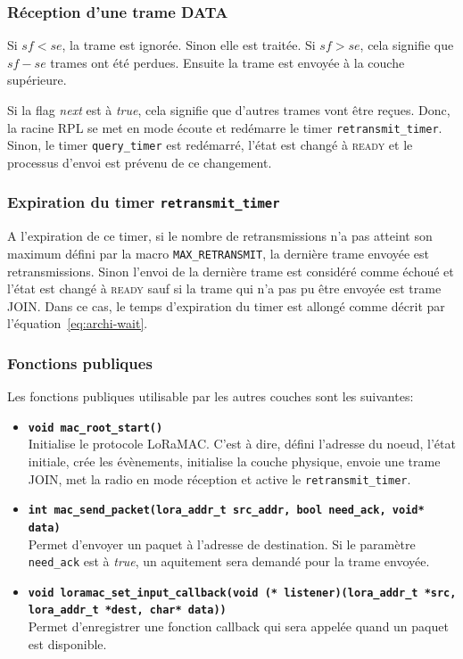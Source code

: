     \subsubsection*{Réception d'une trame DATA}
        Si $sf<se$, la trame est ignorée. Sinon elle est traitée. Si $sf > se$, cela signifie que $sf - se$ trames ont été perdues. Ensuite la trame est envoyée à la couche supérieure.

        Si la flag \textit{next} est à \textit{true}, cela signifie que d'autres trames vont être reçues. Donc, la racine RPL se met en mode écoute et redémarre le timer \texttt{retransmit\_timer}. Sinon, le timer \texttt{query\_timer} est redémarré, l'état est changé à \textsc{ready} et le processus d'envoi est prévenu de ce changement.

    \subsubsection*{Expiration du timer \texttt{retransmit\_timer}}
        A l'expiration de ce timer, si le nombre de retransmissions n'a pas atteint son maximum 
        défini par la macro \texttt{MAX\_RETRANSMIT}, la dernière trame envoyée est retransmissions.
        Sinon l'envoi de la dernière trame est considéré comme échoué et l'état est changé à \textsc
        {ready} sauf si la trame qui n'a pas pu être envoyée est trame JOIN. Dans ce cas, le temps 
        d'expiration du timer est allongé comme décrit par l'équation~\ref{eq:archi-wait}.

    \subsubsection*{Fonctions publiques}
        Les fonctions publiques utilisable par les autres couches sont les suivantes:
        \begin{itemize}
            \item \textbf{\texttt{void mac\_root\_start()}}\\
                Initialise le protocole LoRaMAC. C'est à dire, défini l'adresse du noeud, l'état 
                initiale, crée les évènements, initialise la couche physique, envoie une trame 
                JOIN, met la radio en mode réception et active le \texttt{retransmit\_timer}.

            \item \textbf{\texttt{int mac\_send\_packet(lora\_addr\_t src\_addr, bool need\_ack, void* data)}}\\
                Permet d'envoyer un paquet à l'adresse de destination. Si le paramètre \texttt{need\_ack} est à \textit{true}, un aquitement sera demandé pour la trame envoyée.

            \item \textbf{\texttt{void loramac\_set\_input\_callback(void (* listener)(lora\_addr\_t *src, lora\_addr\_t *dest, char* data))}}\\
                Permet d'enregistrer une fonction callback qui sera appelée quand un paquet est disponible.
        \end{itemize}

